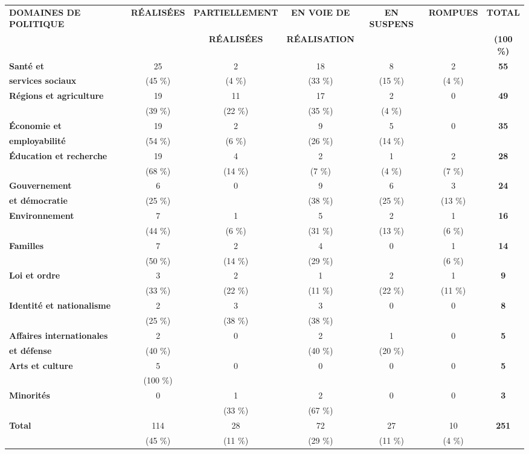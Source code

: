 \documentclass{article}
\begin{document}
\begin{table}[]
\begin{tabular}{|l|g|c|g|c|g|c|}
\hline
{}
\textbf{DOMAINES DE POLITIQUE} & \textbf{RÉALISÉES} & \textbf{PARTIELLEMENT} & \textbf{EN VOIE DE} & \textbf{EN SUSPENS} & \textbf{ROMPUES} & \textbf{TOTAL} \\ 
 & & \textbf{RÉALISÉES} & \textbf{RÉALISATION} & & & \textbf{(100 \%)} \\ \hline
\textbf{Santé et} & 25 & 2 & 18 & 8 & 2 & \textbf{55} \\
\textbf{services sociaux} & (45 \%) & (4 \%) & (33 \%) & (15 \%) & (4 \%) & \\ \hline
\textbf{Régions et agriculture} & 19 & 11 & 17 & 2 & 0 & \textbf{49} \\
 & (39 \%) & (22 \%) & (35 \%) & (4 \%) & & \\ \hline
\textbf{Économie et} & 19 & 2 & 9 & 5 & 0 & \textbf{35} \\
\textbf{employabilité} & (54 \%) & (6 \%) & (26 \%) & (14 \%) & & \\ \hline
\textbf{Éducation et recherche} & 19 & 4 & 2 & 1 & 2 & \textbf{28} \\ 
 & (68 \%) & (14 \%) & (7 \%) & (4 \%) & (7 \%) & \\ \hline
\textbf{Gouvernement} & 6 & 0 & 9 & 6 & 3 & \textbf{24} \\
\textbf{et démocratie} & (25 \%) & & (38 \%) & (25 \%) & (13 \%) & \\ \hline
\textbf{Environnement} & 7 & 1 & 5 & 2 & 1 & \textbf{16} \\
 & (44 \%) & (6 \%) & (31 \%) & (13 \%) & (6 \%) & \\ \hline
\textbf{Familles} & 7 & 2 & 4 & 0 & 1 & \textbf{14} \\
 & (50 \%) & (14 \%) & (29 \%) & & (6 \%) & \\ \hline
\textbf{Loi et ordre} & 3 & 2 & 1 & 2 & 1 & \textbf{9} \\
 & (33 \%) & (22 \%) & (11 \%) & (22 \%) & (11 \%) & \\ \hline
\textbf{Identité et nationalisme} & 2 & 3 & 3 & 0 & 0 & \textbf{8} \\
 & (25 \%) & (38 \%) & (38 \%) & & & \\ \hline
\textbf{Affaires internationales} & 2 & 0 & 2 & 1 & 0 & \textbf{5} \\ 
\textbf{et défense} & (40 \%) & & (40 \%) & (20 \%) & & \\ \hline
\textbf{Arts et culture} & 5 & 0 & 0 & 0 & 0 & \textbf{5} \\ 
 & (100 \%) & & & & & \\ \hline
\textbf{Minorités} & 0 & 1 & 2 & 0 & 0 & \textbf{3} \\
 & & (33 \%) & (67 \%) & & & \\ \hline
\textbf{Total} & 114 & 28 & 72 & 27 & 10 & \textbf{251} \\
 & (45 \%) & (11 \%) & (29 \%) & (11 \%) & (4 \%) & \\ \hline
\end{tabular}%
\end{table}
\end{document}
